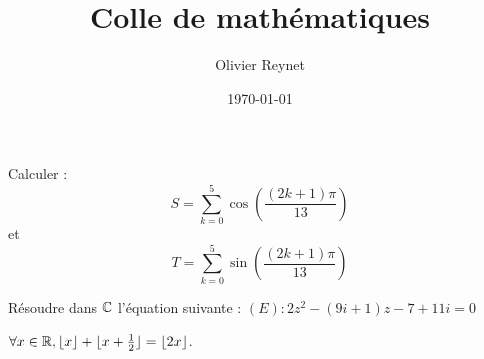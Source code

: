 \documentclass[french,12pt,a4paper]{article}
\author{Olivier Reynet}
\title{Colle de mathématiques}
\date{\today}
\begin{document}
\maketitle


\begin{exercise}[subtitle=Somme de cosinus]
	Calculer :
	$$S = \sum\limits_{k=0}^{5} \cos(\frac{(2k+1)\pi}{13})$$
	et 
	$$T = \sum\limits_{k=0}^{5} \sin(\frac{(2k+1)\pi}{13})$$
\end{exercise}



\begin{exercise}[subtitle= Résolution d'équation dans $\CC$]
	Résoudre dans $\CC$ l'équation suivante : 
	 $(E) : 2z^2-(9i+1)z-7+11i=0$
\end{exercise}

\begin{exercise}[subtitle= Partie entière]
 \Mq $\forall x \in \mathbb{R}, \lfloor x \rfloor + \lfloor x + \frac{1}{2} \rfloor = \lfloor 2 x \rfloor$.
\end{exercise}
\end{document}
